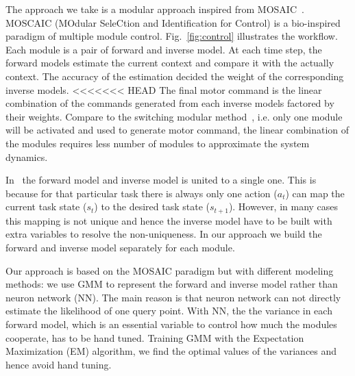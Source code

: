 
The approach we take is a modular approach inspired from MOSAIC~\cite{haruno2001mosaic}. MOSCAIC (MOdular SeleCtion and Identification for Control) is a bio-inspired paradigm of multiple module control. Fig.~\ref{fig:control} illustrates the workflow. Each module is a pair of forward and inverse model. At each time step, the forward models estimate the current context and compare it with the actually context. The accuracy of the estimation decided the weight of the corresponding inverse models.
<<<<<<< HEAD
The final motor command is the linear combination of the commands generated from each inverse models factored by their weights. Compare to the switching modular method~\cite{narendra1997adaptive}, i.e. only one module will be activated and used to generate motor command, the linear combination of the modules requires less number of modules to approximate the system dynamics. 

In~\cite{petkos2006learning} the forward model and inverse model is united to a single one. This is because for that particular task there is always only one action ($a_t$) can map the current task state ($s_t$) to the desired task state ($s_{t+1}$). However, in many cases this mapping is not unique and hence the inverse model have to be built with extra variables to resolve the non-uniqueness. In our approach we build the forward and inverse model separately for each module.

Our approach is based on the MOSAIC paradigm but with different modeling methods: we use GMM to represent the forward and inverse model rather than neuron network (NN). The main reason is that neuron network can not directly estimate the likelihood of one query point. With NN, the the variance in each forward model, which is an essential variable to control how much the modules  cooperate, has to be hand tuned. Training GMM with the Expectation Maximization (EM) algorithm, we find the optimal values of the variances and hence avoid hand tuning.

